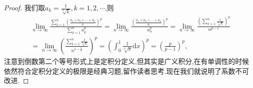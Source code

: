 \documentclass[../../main.tex]{subfiles}%
\begin{document}
\begin{proof}

我们取$a_k=\frac{1}{\sqrt[p]{k}},k=1,2,\cdots$,则
\begin{align*}
&\lim\limits_{n\to\infty}\frac{\sum\limits_{k=1}^n\left( \frac{a_1+a_2+\cdots+a_k}{k} \right)^p}{\sum\limits_{k=1}^n a_k^p} = \lim\limits_{n\to\infty}\frac{\left( \frac{a_1+a_2+\cdots+a_n}{n} \right)^p}{a_n^p} = \lim\limits_{n\to\infty}\frac{\left( \sum\limits_{k=1}^n \frac{1}{\sqrt[p]{k}} \right)^p}{n^{p-1}} \\
&= \lim\limits_{n\to\infty}\left( \frac{\sum\limits_{k=1}^n \frac{1}{\sqrt[p]{k}}}{n^{1-\frac{1}{p}}} \right)^p = \left( \int_0^1 \frac{1}{\sqrt[p]{x}} \mathrm{d}x \right)^p = \left( \frac{p}{p-1} \right)^p,
\end{align*}
注意到倒数第二个等号形式上是定积分定义,但其实是广义积分,在有单调性的时候依然符合定积分定义的极限是经典习题,留作读者思考.现在我们就说明了系数不可改进.


\end{proof}
\end{document}
